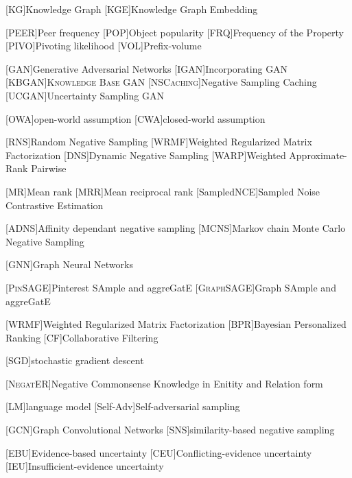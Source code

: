 \begin{acronym}[ECU]

[KG]{Knowledge Graph}
[KGE]{Knowledge Graph Embedding}

[\textsc{PEER}]{Peer frequency}
[\textsc{POP}]{Object popularity }
[\textsc{FRQ}]{Frequency of the Property}
[\textsc{PIVO}]{Pivoting likelihood}
[\textsc{VOL}]{Prefix-volume}

[GAN]{Generative Adversarial Networks}
[\textsc{IGAN}]{Incorporating GAN}
[\textsc{KBGAN}]{\textsc{Knowledge Base GAN}}
[\textsc{NSCaching}]{Negative Sampling Caching}
[\textsc{UCGAN}]{Uncertainty Sampling GAN}

[OWA]{open-world assumption}
[CWA]{closed-world assumption}

[RNS]{Random Negative Sampling}
[WRMF]{Weighted Regularized Matrix Factorization}
[DNS]{Dynamic Negative Sampling}
[WARP]{Weighted Approximate-Rank Pairwise}

[MR]{Mean rank}
[MRR]{Mean reciprocal rank}
[SampledNCE]{Sampled Noise Contrastive Estimation}

[\textsc{ADNS}]{Affinity dependant negative sampling}
[\textsc{MCNS}]{Markov chain Monte Carlo Negative Sampling}
    
[GNN]{Graph Neural Networks}

[\textsc{PinSAGE}]{Pinterest SAmple and aggreGatE}
[\textsc{GraphSAGE}]{Graph SAmple and aggreGatE}


[WRMF]{Weighted Regularized Matrix Factorization}
[BPR]{Bayesian Personalized Ranking}
[CF]{Collaborative Filtering}

[SGD]{stochastic gradient descent}

[\textsc{NegatER}]{Negative Commonsense Knowledge in Enitity and Relation form}

[LM]{language model}
[Self-Adv]{Self-adversarial sampling}

[GCN]{Graph Convolutional Networks}
[SNS]{similarity-based negative sampling}


[EBU]{Evidence-based uncertainty}
[CEU]{Conflicting-evidence uncertainty}
[IEU]{Insufficient-evidence uncertainty}


\end{acronym}
